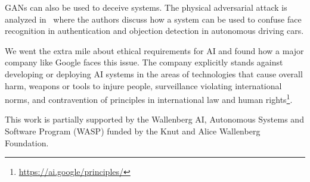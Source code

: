 \documentclass[12pt]{article}
\begin{document}
    GANs can also be used to deceive systems.
    The physical adversarial attack is analyzed in~\cite{arxiv:1812.10217} where the authors discuss
    how a system can be used to confuse face recognition in authentication and objection detection in autonomous driving cars.

    We went the extra mile about ethical requirements for AI and found how a major company like Google faces this issue.
    The company explicitly stands against developing or deploying AI systems in the areas of technologies that cause overall harm, weapons or tools to injure people, surveillance violating international norms, and contravention of principles in international law and human rights\footnote{\url{https://ai.google/principles/}}.

    \begin{ack}
        This work is partially supported by the Wallenberg AI, Autonomous Systems and Software Program (WASP) funded by the Knut and Alice Wallenberg Foundation.
    \end{ack}

    

    
\end{document}
